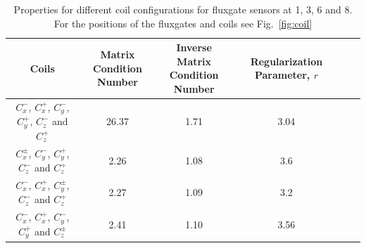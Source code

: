 \begin{table} [htb!]
    \centering
    \begin{tabular} { |c|c|c|c|c|c|} 
        \hline
        Coils & \makecell{Matrix \\Condition Number} &\makecell{Inverse Matrix \\ Condition Number} & \makecell{Regularization \\Parameter, $r$}\\
        \hline\hline
        \makecell{$C_x^-$, $C_x^+$, $C_y^-$,\\ $C_y^+$, $C_z^-$ and $C_z^+$ } & 26.37 & 1.71 & 3.04 \\ 
        \hline
        \makecell{$C_x^{\pm}$, $C_y^-$, $C_y^+$,\\ $C_z^-$ and $C_z^+$ } & 2.26 & 1.08 & 3.6 \\         
        \hline
        \makecell{$C_x^-$, $C_x^+$, $C_y^\pm$,\\ $C_z^-$ and $C_z^+$ } & 2.27 & 1.09 & 3.2 \\
        \hline
        \makecell{$C_x^-$, $C_x^+$, $C_y^-$,\\ $C_y^+$ and $C_z^\pm$ } & 2.41 & 1.10 & 3.56 \\
        \hline

    \end{tabular}
    \caption[Properties for different coil configurations]{Properties for different coil configurations for fluxgate sensors at 1, 3, 6 and 8. For the positions of the fluxgates and coils see Fig.~\ref{fig:coil}}\label{table:mcond_coil}
\end{table}

